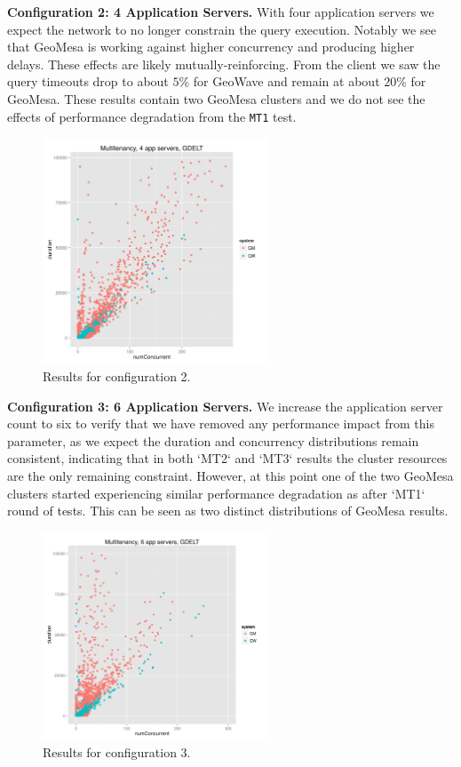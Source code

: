 {\bf Configuration 2: 4 Application Servers.}
With four application servers we expect the network to no longer constrain the query execution. Notably we see that GeoMesa is working against higher concurrency and producing higher delays.
These effects are likely mutually-reinforcing.
From the client we saw the query timeouts drop to about $5$\% for GeoWave and remain at about $20$\% for GeoMesa.
These results contain two GeoMesa clusters and we do not see the effects of performance degradation from the \texttt{MT1} test.
\begin{figure}[h!tb]
  \centering
  \includegraphics[width=0.60\textwidth]{../docs/img/multitenancy/graph_100k_mt2.png}
  \caption{Results for configuration 2.}
  \label{config2}
\end{figure}

{\bf Configuration 3: 6 Application Servers.}
We increase the application server count to six to verify that we have removed any performance impact from this parameter, as we expect the duration and concurrency distributions remain consistent, indicating that in both `MT2` and `MT3` results the cluster resources are the only remaining constraint.
However, at this point one of the two GeoMesa clusters started experiencing similar performance degradation as after `MT1` round of tests. This can be seen as two distinct distributions of GeoMesa results.
\begin{figure}[h!tb]
  \centering
  \includegraphics[width=0.60\textwidth]{../docs/img/multitenancy/graph_100k_mt3.png}
  \caption{Results for configuration 3.}
  \label{config3}
\end{figure}


